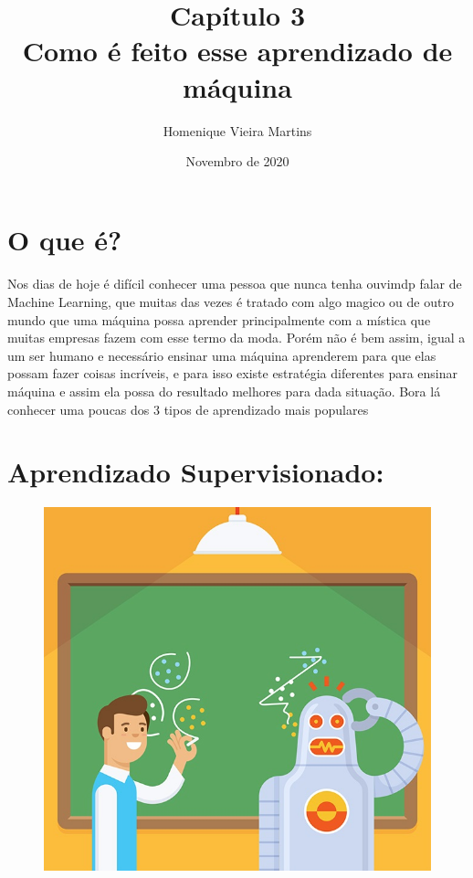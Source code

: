 \documentclass{article}
\title{\textbf{Capítulo 3 \\ Como é feito esse aprendizado de máquina}}
\author{Homenique Vieira Martins}
\date{Novembro de 2020}
\begin{document}
    
    \maketitle

    \Large

    \section{O que é?}
    \paragraph{}Nos dias de hoje é difícil conhecer uma pessoa que nunca tenha ouvimdp falar de Machine 
    Learning, que muitas das vezes é tratado com algo magico ou de outro mundo que uma máquina 
    possa aprender principalmente com a mística que muitas empresas fazem com esse termo da moda. Porém não é bem assim, igual a um ser humano e necessário ensinar uma máquina aprenderem para que elas possam fazer coisas incríveis, e para isso existe estratégia diferentes para ensinar máquina e assim ela possa do resultado melhores para dada situação. Bora lá conhecer uma poucas dos 3 tipos de aprendizado mais populares 

    \section{Aprendizado Supervisionado:}
    \begin{figure}[ht]
        \centering
        \includegraphics[scale=0.3]{robo_aprendedo.jpg}
    \end{figure}
\end{document}
